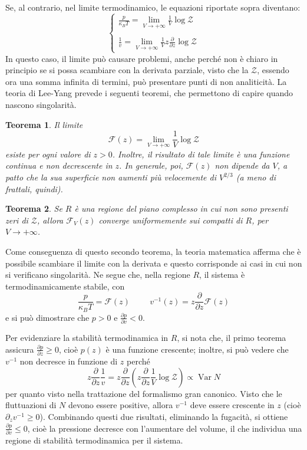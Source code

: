 \documentclass[11pt, a4paper]{scrartcl}
\theoremstyle{style}
\newtheorem{teorema}{Teorema}[section]
\theoremstyle{style1}
\numberwithin{equation}{subsection}
\begin{document}
Se, al contrario, nel limite termodinamico, le equazioni riportate sopra diventano:
\[
\begin{cases}
	\displaystyle \frac{p}{\kappa _B T }= \lim_{V \to +\infty} \frac{1}{V}\log\mathcal{Z} \\
	\\
	\displaystyle \frac{1}{v}=\lim_{V \to +\infty} \frac{1}{V} z \frac{\partial }{\partial z} \log\mathcal{Z} 
\end{cases}
\] 
In questo caso, il limite pu\`o causare problemi, anche perch\'e non \`e chiaro in principio se si possa scambiare con la derivata parziale, visto che la $\mathcal{Z} $, essendo ora una somma infinita di termini, pu\`o presentare punti di non analiticit\`a. 
La teoria di Lee-Yang prevede i seguenti teoremi, che permettono di capire quando nascono singolarit\`a.

\begin{teorema}
Il limite 
\[
\mathcal{F} (z) = \lim_{V \to +\infty} \frac{1}{V}\log\mathcal{Z} 
\] 
esiste per ogni valore di $z>0$. 
Inoltre, il risultato di tale limite \`e una funzione continua e non decrescente in $z$.
In generale, poi, $\mathcal{F} (z)$ non dipende da $V$, a patto che la sua superficie non aumenti pi\`u velocemente di $V^{2 / 3}$ (a meno di frattali, quindi).
\end{teorema}
\begin{teorema}
Se $R$ \`e una regione del piano complesso in cui non sono presenti zeri di $\mathcal{Z} $, allora $\mathcal{F} _V(z)$ converge uniformemente sui compatti di $R$, per $V\to +\infty$.
\end{teorema}
Come conseguenza di questo secondo teorema, la teoria matematica afferma che \`e possibile scambiare il limite con la derivata e questo corrisponde ai casi in cui non si verificano singolarit\`a.
Ne segue che, nella regione $R$, il sistema \`e termodinamicamente stabile, con 
\[
\frac{p}{\kappa _B T } = \mathcal{F}(z) \hspace{1cm} v^{-1}(z) = z \frac{\partial }{\partial z} \mathcal{F} (z)
\] 
e si pu\`o dimostrare che $p>0$ e $\frac{\partial p}{\partial v}  < 0$.

Per evidenziare la stabilit\`a termodinamica in $R$, si nota che, il primo teorema assicura $\frac{\partial p}{\partial z} \ge  0$, cio\`e $p(z)$ \`e una funzione crescente; inoltre, si pu\`o vedere che $v^{-1}$ non decresce in funzione di $z$ perch\'e
\[
z \frac{\partial }{\partial z} \frac{1}{v}= z \frac{\partial }{\partial z} \left(z \frac{\partial }{\partial z} \frac{1}{V}\log\mathcal{Z} \right) \propto \operatorname{Var} N
\] 
per quanto visto nella trattazione del formalismo gran canonico. Visto che le fluttuazioni di $N$ devono essere positive, allora $v^{-1}$ deve essere crescente in $z$ (cio\`e $\partial _z v^{-1}\ge 0$).
Combinando questi due risultati, eliminando la fugacit\`a, si ottiene $\frac{\partial p}{\partial v} \le 0$, cio\`e la pressione decresce con l'aumentare del volume, il che individua una regione di stabilit\`a termodinamica per il sistema.
\end{document}
